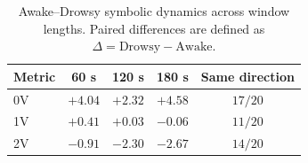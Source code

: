 \begin{table}[t]
    \centering
    \caption{Awake--Drowsy symbolic dynamics across window lengths. Paired differences are defined as $\Delta=\mathrm{Drowsy}-\mathrm{Awake}$.}
    \label{tab:symbolic_results}
    \footnotesize
    \setlength{\tabcolsep}{4pt}
    \renewcommand{\arraystretch}{1.10}

    \begin{tabular}{lcccc}
        \toprule
        \textbf{Metric}
        & \textbf{60 s}
        & \textbf{120 s}
        & \textbf{180 s}
        & \textbf{Same direction} \\
        \midrule

        0V
        & $+4.04$
        & $+2.32$
        & $+4.58$
        & $17/20$ \\

        1V
        & $+0.41$
        & $+0.03$
        & $-0.06$
        & $11/20$ \\

        2V
        & $-0.91$
        & $-2.30$
        & $-2.67$
        & $14/20$ \\

        \bottomrule
    \end{tabular}
\end{table}